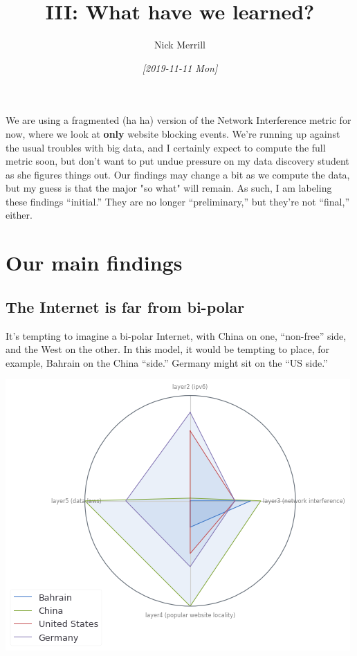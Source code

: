 \documentclass[11pt]{article}
\author{Nick Merrill}
\date{\textit{[2019-11-11 Mon]}}
\title{III: What have we learned?}
\begin{document}
\maketitle
We are using a fragmented (ha ha) version of the Network Interference metric for
now, where we look at \textbf{only} website blocking events. We're running up against
the usual troubles with big data, and I certainly expect to compute the full
metric soon, but don't want to put undue pressure on my data discovery student
as she figures things out. Our findings may change a bit as we compute the data,
but my guess is that the major "so what" will remain. As such, I am labeling
these findings ``initial.'' They are no longer ``preliminary,'' but they're not
``final,'' either.

\section{Our main findings}
\label{sec:org814cd39}

\subsection{The Internet is far from bi-polar}
\label{sec:orgd229b3e}

It's tempting to imagine a bi-polar Internet, with China on one, ``non-free''
side, and the West on the other. In this model, it would be tempting to place,
for example, Bahrain on the China ``side.'' Germany might sit on the ``US
side.''

\begin{center}
\includegraphics[width=.9\linewidth]{./figures/us-cn-bh-de.png}
\end{center}
\end{document}
